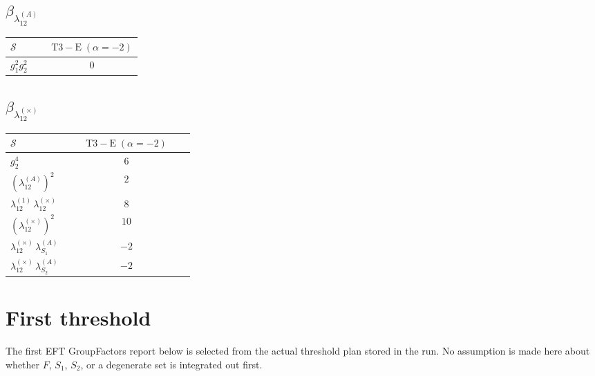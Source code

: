 \documentclass[9pt]{article}
\begin{document}
\subsection*{$ \beta_{\lambda_{12}^{(A)}} $}
\begin{longtable}{@{}p{0.31\linewidth}c@{}}
\toprule
$\mathcal{S}$ & $ \mathrm{T3-E}\;(\alpha=-2) $ \\
\midrule
$ g_1^2g_2^2 $ & $ 0 $ \\
\bottomrule
\end{longtable}
\subsection*{$ \beta_{\lambda_{12}^{(\times)}} $}
\begin{longtable}{@{}p{0.31\linewidth}c@{}}
\toprule
$\mathcal{S}$ & $ \mathrm{T3-E}\;(\alpha=-2) $ \\
\midrule
$ g_2^4 $ & $ 6 $ \\
$ \left(\lambda_{12}^{(A)}\right)^2 $ & $ 2 $ \\
$ \lambda_{12}^{(1)}\,\lambda_{12}^{(\times)} $ & $ 8 $ \\
$ \left(\lambda_{12}^{(\times)}\right)^2 $ & $ 10 $ \\
$ \lambda_{12}^{(\times)}\,\lambda_{S_1}^{(A)} $ & $ -2 $ \\
$ \lambda_{12}^{(\times)}\,\lambda_{S_2}^{(A)} $ & $ -2 $ \\
\bottomrule
\end{longtable}
\section*{First threshold}
The first EFT GroupFactors report below is selected from the actual threshold plan stored in the run.  No assumption is made here about whether $F$, $S_1$, $S_2$, or a degenerate set is integrated out first.
\end{document}
